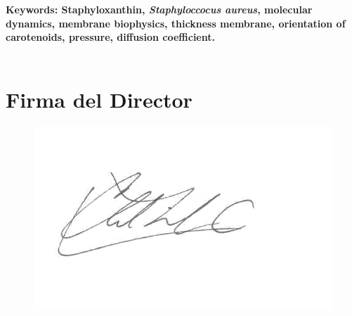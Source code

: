 \documentclass[12pt]{article}
\begin{document}
\textbf{\small Keywords: Staphyloxanthin, \textit{Staphyloccocus aureus}, molecular dynamics, membrane biophysics, thickness membrane, orientation of carotenoids, pressure, diffusion coefficient.}\\
\\[2.0cm]



\section*{Firma del Director}
\vspace{1.5cm}
\begin{figure}[h]
\begin{center}
    \includegraphics[scale=0.6]{firma.jpg}
  \label{fig:firma}
\end{center}
\end{figure}
\end{document}
